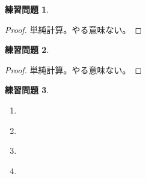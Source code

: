 \documentclass[uplatex]{jsarticle}
\theoremstyle{definition}
\newtheorem{prob}[prob]{練習問題}
\begin{document}
\begin{prob}\label{prob: 7.5}
\end{prob}
\begin{proof}
  単純計算。やる意味ない。
\end{proof}
\begin{prob}\label{prob: 7.6}
\end{prob}
\begin{proof}
  単純計算。やる意味ない。
\end{proof}





\begin{prob}\label{prob: 7.7}
  \begin{enumerate}
    \item \label{enumi: 7.7-1}
    \item \label{enumi: 7.7-2}
    \item \label{enumi: 7.7-3}
    \item \label{enumi: 7.7-4}
  \end{enumerate}
\end{prob}
\end{document}
